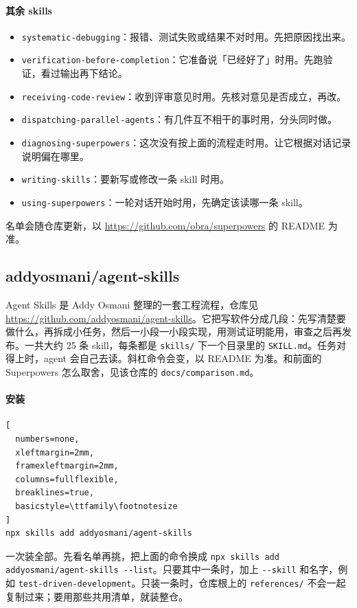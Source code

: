 \paragraph{其余 skills}
\begin{itemize}
\item \verb|systematic-debugging|：报错、测试失败或结果不对时用。先把原因找出来。
\item \verb|verification-before-completion|：它准备说「已经好了」时用。先跑验证，看过输出再下结论。
\item \verb|receiving-code-review|：收到评审意见时用。先核对意见是否成立，再改。
\item \verb|dispatching-parallel-agents|：有几件互不相干的事时用，分头同时做。
\item \verb|diagnosing-superpowers|：这次没有按上面的流程走时用。让它根据对话记录说明偏在哪里。
\item \verb|writing-skills|：要新写或修改一条 skill 时用。
\item \verb|using-superpowers|：一轮对话开始时用，先确定该读哪一条 skill。
\end{itemize}
名单会随仓库更新，以 \url{https://github.com/obra/superpowers} 的 README 为准。



\subsection{addyosmani/agent-skills}
Agent Skills 是 Addy Osmani 整理的一套工程流程，仓库见 \url{https://github.com/addyosmani/agent-skills}。它把写软件分成几段：先写清楚要做什么，再拆成小任务，然后一小段一小段实现，用测试证明能用，审查之后再发布。一共大约 25 条 skill，每条都是 \verb|skills/| 下一个目录里的 \verb|SKILL.md|。任务对得上时，agent 会自己去读。斜杠命令会变，以 README 为准。和前面的 Superpowers 怎么取舍，见该仓库的 \verb|docs/comparison.md|。

\paragraph{安装}
\begin{lstlisting}[
  numbers=none,
  xleftmargin=2mm,
  framexleftmargin=2mm,
  columns=fullflexible,
  breaklines=true,
  basicstyle=\ttfamily\footnotesize
]
npx skills add addyosmani/agent-skills
\end{lstlisting}
一次装全部。先看名单再挑，把上面的命令换成 \verb|npx skills add addyosmani/agent-skills --list|。只要其中一条时，加上 \verb|--skill| 和名字，例如 \verb|test-driven-development|。只装一条时，仓库根上的 \verb|references/| 不会一起复制过来；要用那些共用清单，就装整仓。

